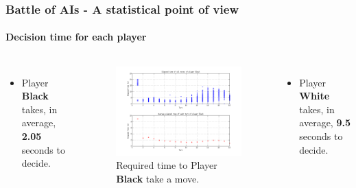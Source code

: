 \documentclass[10pt]{beamer}
\begin{document}
\begin{frame}
\frametitle{Battle of AIs - A statistical point of view}
\framesubtitle{Decision time for each player}

	\begin{columns}
		
		\begin{itemize}
		  
		  \item Player \textbf{Black} takes, in average, \textbf{2.05}
		  seconds to decide.
	
		\end{itemize}
		
		\vspace{-15pt}
		
		\begin{figure}[h]
		\centering
		\includegraphics[scale=.22 ]{images/LBtimes}
		\caption{\centering Required time to Player \textbf{Black} take a move.}
		\label{fig:gui}
		\end{figure}
		
		
	
		\begin{itemize}
			\item Player \textbf{White} takes, in average, \textbf{9.5}  seconds to
			decide.
		\end{itemize}
		
		\vspace{-25pt}
		

\end{columns}
\end{frame}
\end{document}
